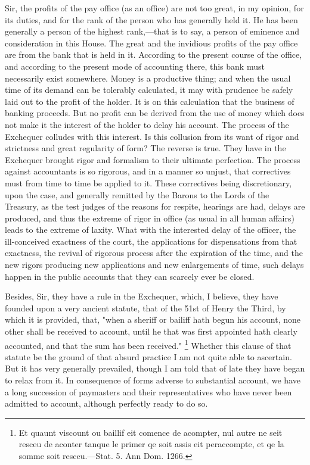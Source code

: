 Sir, the profits of the pay office (as an office) are not too great, in my opinion, for its duties, and for the rank of the person who has generally held it. He has been generally a person of the highest rank,—that is to say, a person of eminence and consideration in this House. The great and the invidious profits of the pay office are from the bank that is held in it. According to the present course of the office, and according to the present mode of accounting there, this bank must necessarily exist somewhere. Money is a productive thing; and when the usual time of its demand can be tolerably calculated, it may with prudence be safely laid out to the profit of the holder. It is on this calculation that the business of banking proceeds. But no profit can be derived from the use of money which does not make it the interest of the holder to delay his account. The process of the Exchequer colludes with this interest. Is this collusion from its want of rigor and strictness and great regularity of form? The reverse is true. They have in the Exchequer brought rigor and formalism to their ultimate perfection. The process against accountants is so rigorous, and in a manner so unjust, that correctives must from time to time be applied to it. These correctives being discretionary, upon the case, and generally remitted by the Barons to the Lords of the Treasury, as the test judges of the reasons for respite, hearings are had, delays are produced, and thus the extreme of rigor in office (as usual in all human affairs) leads to the extreme of laxity. What with the interested delay of the officer, the ill-conceived exactness of the court, the applications for dispensations from that exactness, the revival of rigorous process after the expiration of the time, and the new rigors producing new applications and new enlargements of time, such delays happen in the public accounts that they can scarcely ever be closed.

Besides, Sir, they have a rule in the Exchequer, which, I believe, they have founded upon a very ancient statute, that of the 51st of Henry the Third, by which it is provided, that, "when a sheriff or bailiff hath begun his account, none other shall be received to account, until he that was first appointed hath clearly accounted, and that the sum has been received."
\footnote{ Et quaunt viscount ou baillif eit comence de acompter, nul autre ne seit resceu de aconter tanque le primer qe soit assis eit peraccompte, et qe la somme soit resceu.—Stat. 5. Ann Dom. 1266.}
 Whether this clause of that statute be the ground of that absurd practice I am not quite able to ascertain. But it has very generally prevailed, though I am told that of late they have began to relax from it. In consequence of forms adverse to substantial account, we have a long succession of paymasters and their representatives who have never been admitted to account, although perfectly ready to do so.

